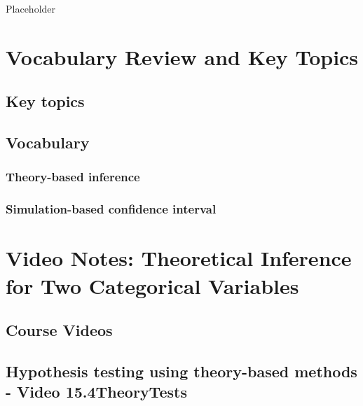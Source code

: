 \documentclass[
]{report}
\begin{document}
Placeholder

\section{Vocabulary Review and Key Topics}\label{vocabulary-review-and-key-topics-7}

\subsection{Key topics}\label{key-topics-8}

\subsection{Vocabulary}\label{vocabulary-7}

\subsubsection*{Theory-based inference}\label{theory-based-inference}

\subsubsection*{Simulation-based confidence interval}\label{simulation-based-confidence-interval-1}

\section{Video Notes: Theoretical Inference for Two Categorical Variables}\label{video-notes-theoretical-inference-for-two-categorical-variables}

\subsection{Course Videos}\label{course-videos-7}

\subsection*{Hypothesis testing using theory-based methods - Video 15.4TheoryTests}\label{hypothesis-testing-using-theory-based-methods---video-15.4theorytests}
\end{document}
